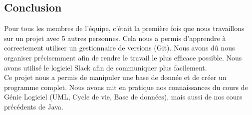\documentclass{article}
\begin{document}
\begin{flushleft}
\section{Conclusion}
Pour tous les membres de l'équipe, c'était la première fois que nous
travaillons sur un projet avec 5 autres personnes. Cela nous a permis
d'apprendre à correctement utiliser un gestionnaire de versions (Git). Nous
avons dû nous organiser précisemment afin de rendre le travail le plus efficace
possible. Nous avons utilisé le logiciel Slack afin de communiquer plus
facilement. \\
Ce projet nous a permis de manipuler une base de donnée et de créer un
programme complet. Nous avons mit en pratique nos connaissances du cours
de Génie Logiciel (UML, Cycle de vie, Base de données), mais aussi de nos cours
précédents de Java.





\end{flushleft}
\end{document}
